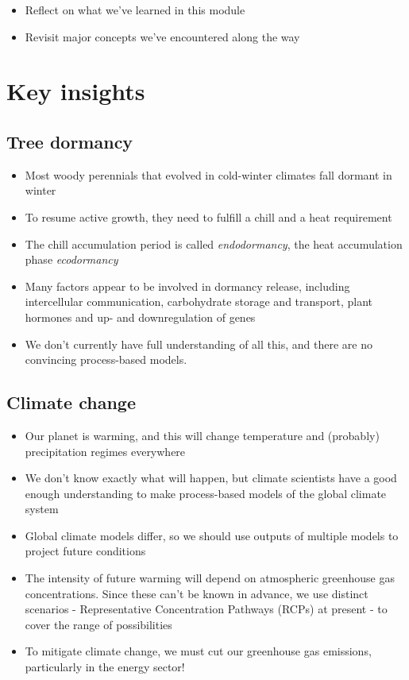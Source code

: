 \documentclass[
]{book}
\providecommand{\tightlist}{%
  \setlength{\itemsep}{0pt}\setlength{\parskip}{0pt}}
\begin{document}
\begin{itemize}
\tightlist
\item
  Reflect on what we've learned in this module
\item
  Revisit major concepts we've encountered along the way
\end{itemize}

\hypertarget{key-insights}{%
\section{Key insights}\label{key-insights}}

\hypertarget{tree-dormancy-1}{%
\subsection{Tree dormancy}\label{tree-dormancy-1}}

\begin{itemize}
\tightlist
\item
  Most woody perennials that evolved in cold-winter climates fall dormant in winter
\item
  To resume active growth, they need to fulfill a chill and a heat requirement
\item
  The chill accumulation period is called \emph{endodormancy}, the heat accumulation phase \emph{ecodormancy}
\item
  Many factors appear to be involved in dormancy release, including intercellular communication, carbohydrate storage and transport, plant hormones and up- and downregulation of genes
\item
  We don't currently have full understanding of all this, and there are no convincing process-based models.
\end{itemize}

\hypertarget{climate-change}{%
\subsection{Climate change}\label{climate-change}}

\begin{itemize}
\tightlist
\item
  Our planet is warming, and this will change temperature and (probably) precipitation regimes everywhere
\item
  We don't know exactly what will happen, but climate scientists have a good enough understanding to make process-based models of the global climate system
\item
  Global climate models differ, so we should use outputs of multiple models to project future conditions
\item
  The intensity of future warming will depend on atmospheric greenhouse gas concentrations. Since these can't be known in advance, we use distinct scenarios - Representative Concentration Pathways (RCPs) at present - to cover the range of possibilities
\item
  To mitigate climate change, we must cut our greenhouse gas emissions, particularly in the energy sector!
\end{itemize}
\end{document}
